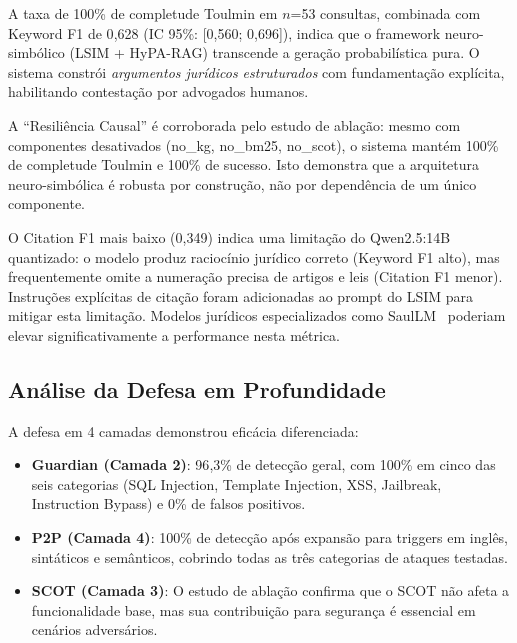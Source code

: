 \documentclass[journal,10pt]{IEEEtran}
\begin{document}
A taxa de 100\% de completude Toulmin em $n$=53 consultas, combinada com Keyword F1 de 0{,}628 (IC 95\%: [0{,}560; 0{,}696]), indica que o framework neuro-simb\'{o}lico (LSIM + HyPA-RAG) transcende a gera\c{c}\~{a}o probabil\'{i}stica pura. O sistema constr\'{o}i \textit{argumentos jur\'{i}dicos estruturados} com fundamenta\c{c}\~{a}o expl\'{i}cita, habilitando contesta\c{c}\~{a}o por advogados humanos.

A ``Resili\^{e}ncia Causal'' \'{e} corroborada pelo estudo de abla\c{c}\~{a}o: mesmo com componentes desativados (no\_kg, no\_bm25, no\_scot), o sistema mant\'{e}m 100\% de completude Toulmin e 100\% de sucesso. Isto demonstra que a arquitetura neuro-simb\'{o}lica \'{e} robusta por constru\c{c}\~{a}o, n\~{a}o por depend\^{e}ncia de um \'{u}nico componente.

O Citation F1 mais baixo (0{,}349) indica uma limita\c{c}\~{a}o do Qwen2.5:14B quantizado: o modelo produz racioc\'{i}nio jur\'{i}dico correto (Keyword F1 alto), mas frequentemente omite a numera\c{c}\~{a}o precisa de artigos e leis (Citation F1 menor). Instru\c{c}\~{o}es expl\'{i}citas de cita\c{c}\~{a}o foram adicionadas ao prompt do LSIM para mitigar esta limita\c{c}\~{a}o. Modelos jur\'{i}dicos especializados como SaulLM~\cite{saullm2024a} poderiam elevar significativamente a performance nesta m\'{e}trica.

\subsection{An\'{a}lise da Defesa em Profundidade}

A defesa em 4 camadas demonstrou efic\'{a}cia diferenciada:

\begin{itemize}
    \item \textbf{Guardian (Camada 2)}: 96{,}3\% de detec\c{c}\~{a}o geral, com 100\% em cinco das seis categorias (SQL Injection, Template Injection, XSS, Jailbreak, Instruction Bypass) e 0\% de falsos positivos.
    \item \textbf{P2P (Camada 4)}: 100\% de detec\c{c}\~{a}o ap\'{o}s expans\~{a}o para triggers em ingl\^{e}s, sint\'{a}ticos e sem\^{a}nticos, cobrindo todas as tr\^{e}s categorias de ataques testadas.
    \item \textbf{SCOT (Camada 3)}: O estudo de abla\c{c}\~{a}o confirma que o SCOT n\~{a}o afeta a funcionalidade base, mas sua contribui\c{c}\~{a}o para seguran\c{c}a \'{e} essencial em cen\'{a}rios advers\'{a}rios.
\end{itemize}
\end{document}
